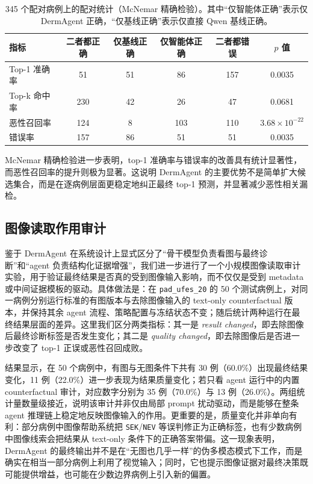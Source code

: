 \documentclass{article}
\begin{document}
\begin{table}[t]
\centering
\caption{345 个配对病例上的配对统计（McNemar 精确检验）。其中“仅智能体正确”表示仅 DermAgent 正确，“仅基线正确”表示仅直接 Qwen 基线正确。}
\label{tab:paired_stats}
\small
\begin{tabular}{lccccc}
\toprule
指标 & 二者都正确 & 仅基线正确 & 仅智能体正确 & 二者都错误 & $p$ 值 \\
\midrule
Top-1 准确率 & 51 & 51 & 86 & 157 & 0.0035 \\
Top-k 命中率 & 230 & 42 & 26 & 47 & 0.0681 \\
恶性召回率 & 124 & 8 & 103 & 110 & $3.68\times10^{-22}$ \\
错误率 & 157 & 86 & 51 & 51 & 0.0035 \\
\bottomrule
\end{tabular}
\end{table}

McNemar 精确检验进一步表明，top-1 准确率与错误率的改善具有统计显著性，而恶性召回率的提升则极为显著。这说明 DermAgent 的主要优势不是简单扩大候选集合，而是在逐病例层面更稳定地纠正最终 top-1 预测，并显著减少恶性相关漏检。

\subsection{图像读取作用审计}

鉴于 DermAgent 在系统设计上显式区分了“骨干模型负责看图与最终诊断”和“agent 负责结构化证据增强”，我们进一步进行了一个小规模图像读取审计实验，用于验证最终结果是否真的受到图像输入影响，而不仅仅是受到 metadata 或中间证据模板的驱动。具体做法是：在 \texttt{pad\_ufes\_20} 的 50 个测试病例上，对同一病例分别运行标准的有图版本与去除图像输入的 text-only counterfactual 版本，并保持其余 agent 流程、策略配置与冻结状态不变；随后统计两种运行在最终结果层面的差异。这里我们区分两类指标：其一是 \emph{result changed}，即去除图像后最终诊断标签是否发生变化；其二是 \emph{quality changed}，即去除图像后是否进一步改变了 top-1 正误或恶性召回成败。

结果显示，在 50 个病例中，有图与无图条件下共有 30 例（60.0\%）出现最终结果变化，11 例（22.0\%）进一步表现为结果质量变化；若只看 agent 运行中的内置 counterfactual 审计，对应数字分别为 35 例（70.0\%）与 13 例（26.0\%）。两组统计量数量级接近，说明该审计并非仅由局部 prompt 扰动驱动，而是能够在整条 agent 推理链上稳定地反映图像输入的作用。更重要的是，质量变化并非单向有利：部分病例中图像帮助系统把 \texttt{SEK}/\texttt{NEV} 等误判修正为正确标签，也有少数病例中图像线索会把结果从 text-only 条件下的正确答案带偏。这一现象表明，DermAgent 的最终输出并不是在“无图也几乎一样”的伪多模态模式下工作，而是确实在相当一部分病例上利用了视觉输入；同时，它也提示图像证据对最终决策既可能提供增益，也可能在少数边界病例上引入新的偏置。
\end{document}

